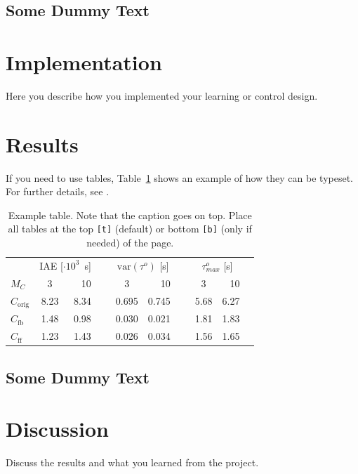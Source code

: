 \documentclass{LTHtwocol} %
\begin{document}
\subsection{Some Dummy Text}
\kant[3]

\section{Implementation}
Here you describe how you implemented your learning or control design. 

\section{Results}
If you need to use tables, Table~\ref{tab:extable} shows an example of how they can be typeset. For further details, see \cite{tablelatexwiki}.

\begin{table}[t]
	\centering
	\caption{Example table. Note that the caption goes on top. Place all tables at the top \texttt{[t]} (default) or bottom \texttt{[b]} (only if needed) of the page.}
	\label{tab:extable}
	\begin{tabular}{lcrrcrrcrr} %
		\toprule
        & 
		\multicolumn{2}{c}{IAE [$\cdot 10^3$~s]} & &
		\multicolumn{2}{c}{$\text{var}(\tau^o)$ [s]} & &  
		\multicolumn{2}{c}{$\tau^o_{max}$ [s]} \\[1mm]
		$M_C$            &  3     & 10  &~& 3     & 10    &~& 3    & 10 \\ 
        \midrule
		$C_{\text{orig}}$ & 8.23 & 8.34 &~& 0.695 & 0.745 &~& 5.68 & 6.27 \\ 
		$C_{\text{fb}}$ & 1.48 & 0.98 &~& 0.030 & 0.021 &~& 1.81 & 1.83 \\ 
		$C_{\text{ff}}$ & 1.23 & 1.43 &~& 0.026 & 0.034 &~& 1.56 & 1.65\\
        \bottomrule 
	\end{tabular}
\end{table}

\subsection{Some Dummy Text}
\kant[4]

\section{Discussion}

Discuss the results and what you learned from the project.


\printbibliography
\end{document}
